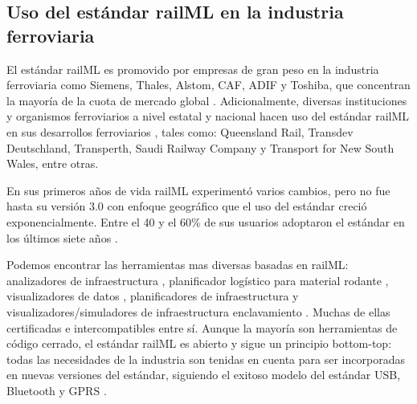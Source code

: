 \subsection{Uso del estándar railML en la industria ferroviaria}

    El estándar railML es promovido por empresas de gran peso en la industria ferroviaria como Siemens, Thales, Alstom, CAF, ADIF y Toshiba, que concentran la mayoría de la cuota de mercado global \cite{PARTNERS}. Adicionalmente, diversas instituciones y organismos ferroviarios a nivel estatal y nacional hacen uso del estándar railML en sus desarrollos ferroviarios \cite{PARTNERS}, tales como: Queensland Rail, Transdev Deutschland, Transperth, Saudi Railway Company y Transport for New South Wales, entre otras.

    En sus primeros años de vida railML experimentó varios cambios, pero no fue hasta su versión 3.0 con enfoque geográfico que el uso del estándar creció exponencialmente. Entre el 40 y el 60\% de sus usuarios adoptaron el estándar en los últimos siete años \cite{PARTNERS}.

    Podemos encontrar las herramientas mas diversas basadas en railML: analizadores de infraestructura \cite{MAPREX}, planificador logístico para material rodante \cite{IVU}, visualizadores de datos \cite{RAILVIVID}, planificadores de infraestructura \cite{VISALL3D} y visualizadores/simuladores de infraestructura enclavamiento \cite{DESIGN4RAIL}. Muchas de ellas certificadas e intercompatibles entre sí. Aunque la mayoría son herramientas de código cerrado, el estándar railML es abierto y sigue un principio bottom-top: todas las necesidades de la industria son tenidas en cuenta para ser incorporadas en nuevas versiones del estándar, siguiendo el exitoso modelo del estándar USB, Bluetooth y GPRS \cite{USB,BLUETOOTH,GPRS}. 